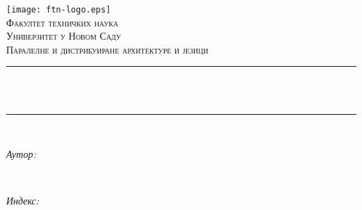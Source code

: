 \begin{titlepage}
	\centering
    \vspace*{0.5 cm}
    \texttt{[image: ftn-logo.eps]}\\[1.0 cm]	                %
    \textsc{\LARGE Факултет техничких наука}\\[0.5 cm]	                    %
	\textsc{\Large Универзитет у Новом Саду}\\[1.0 cm]				        %
	\textsc{\large Паралелне и дистрибуиране архитектуре и језици}\\[0.5 cm]		%
	\rule{\linewidth}{0.2 mm} \\[0.4 cm]
	{ \huge \bfseries \thetitle}\\
	\rule{\linewidth}{0.2 mm} \\[1.5 cm]
	
	\begin{minipage}{0.4\textwidth}
		\begin{flushleft} \large
			\emph{Аутор:}\\
			\theauthor
			\end{flushleft}
			\end{minipage}~
			\begin{minipage}{0.4\textwidth}
			\begin{flushright} \large
			\emph{Индекс:} \\
			\theindex								                        %
		\end{flushright}
	\end{minipage}\\[2.0 cm]
	
	{\large \thedate}\\[2 cm]
	\vfill
\end{titlepage}